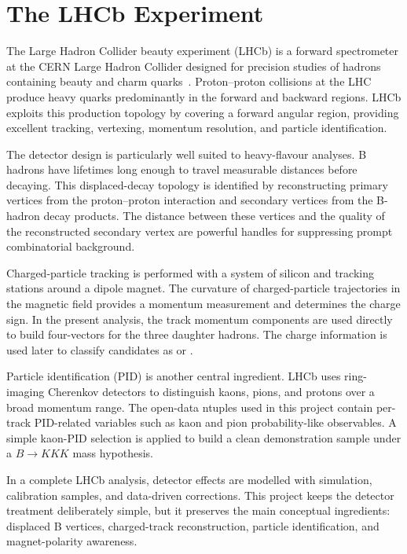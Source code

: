 \section{The LHCb Experiment}

The Large Hadron Collider beauty experiment (LHCb) is a forward spectrometer at the CERN Large Hadron Collider designed for precision studies of hadrons containing beauty and charm quarks~\cite{lhcbdetector}. Proton--proton collisions at the LHC produce heavy quarks predominantly in the forward and backward regions. LHCb exploits this production topology by covering a forward angular region, providing excellent tracking, vertexing, momentum resolution, and particle identification.

The detector design is particularly well suited to heavy-flavour analyses. B hadrons have lifetimes long enough to travel measurable distances before decaying. This displaced-decay topology is identified by reconstructing primary vertices from the proton--proton interaction and secondary vertices from the B-hadron decay products. The distance between these vertices and the quality of the reconstructed secondary vertex are powerful handles for suppressing prompt combinatorial background.

Charged-particle tracking is performed with a system of silicon and tracking stations around a dipole magnet. The curvature of charged-particle trajectories in the magnetic field provides a momentum measurement and determines the charge sign. In the present analysis, the track momentum components are used directly to build four-vectors for the three daughter hadrons. The charge information is used later to classify candidates as \Bplus{} or \Bminus{}.

Particle identification (PID) is another central ingredient. LHCb uses ring-imaging Cherenkov detectors to distinguish kaons, pions, and protons over a broad momentum range. The open-data ntuples used in this project contain per-track PID-related variables such as kaon and pion probability-like observables. A simple kaon-PID selection is applied to build a clean demonstration sample under a $B \to K K K$ mass hypothesis.

In a complete LHCb analysis, detector effects are modelled with simulation, calibration samples, and data-driven corrections. This project keeps the detector treatment deliberately simple, but it preserves the main conceptual ingredients: displaced B vertices, charged-track reconstruction, particle identification, and magnet-polarity awareness.
